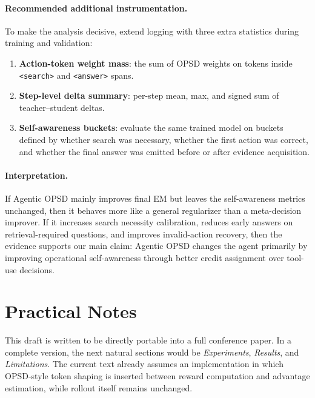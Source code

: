 \documentclass[11pt]{article}
\newcommand{\method}{Agentic OPSD}
\begin{document}
\paragraph{Recommended additional instrumentation.}
To make the analysis decisive, extend logging with three extra statistics during training and validation:
\begin{enumerate}[leftmargin=1.5em]
    \item \textbf{Action-token weight mass}: the sum of OPSD weights on tokens inside \texttt{<search>} and \texttt{<answer>} spans.
    \item \textbf{Step-level delta summary}: per-step mean, max, and signed sum of teacher--student deltas.
    \item \textbf{Self-awareness buckets}: evaluate the same trained model on buckets defined by whether search was necessary, whether the first action was correct, and whether the final answer was emitted before or after evidence acquisition.
\end{enumerate}

\paragraph{Interpretation.}
If \method{} mainly improves final EM but leaves the self-awareness metrics unchanged, then it behaves more like a general regularizer than a meta-decision improver. If it increases search necessity calibration, reduces early answers on retrieval-required questions, and improves invalid-action recovery, then the evidence supports our main claim: \method{} changes the agent primarily by improving operational self-awareness through better credit assignment over tool-use decisions.

\section*{Practical Notes}
This draft is written to be directly portable into a full conference paper. In a complete version, the next natural sections would be \textit{Experiments}, \textit{Results}, and \textit{Limitations}. The current text already assumes an implementation in which OPSD-style token shaping is inserted between reward computation and advantage estimation, while rollout itself remains unchanged.



\end{document}

